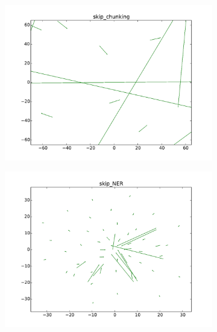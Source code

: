 \begin{figure}
\caption{Updated vs. no-updated word representations for POS-tagging and chunking using skip-gram}
\centering
\begin{subfigure}[b]{0.48\textwidth}
	\centering
    \includegraphics[width=\textwidth]{plots/vectorField/Lizhen/scaled/Lizhen_skip_chunking}
	\label{fig:skipChu}
\end{subfigure}
\begin{subfigure}[b]{0.48\textwidth}
	\centering
    \includegraphics[width=\textwidth]{plots/vectorField/Lizhen/Lizhen_skip_NER}    	
	\label{fig:skippos}
\end{subfigure}
\label{fig:vectorfield}
\end{figure}

